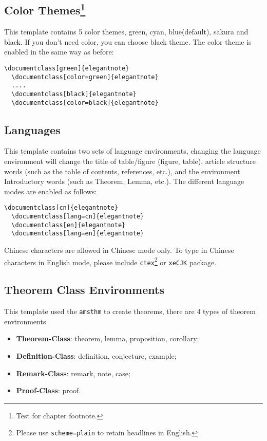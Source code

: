\documentclass[en,hazy,blue,screen,14pt]{elegantnote}
\begin{document}
\newpage
\subsection[Color Themes]{Color Themes\footnote{Test for chapter footnote.}}

This template contains 5 color themes, \textcolor{egreen}{green}, \textcolor{ecyan}{cyan}, \textcolor{eblue}{blue}(default), \textcolor{sakura}{sakura} and \textcolor{black}{black}. If you don't need color, you can choose black theme. The color theme is enabled in the same way as before:
\begin{lstlisting}[frame=none]  
  \documentclass[green]{elegantnote}
  \documentclass[color=green]{elegantnote}
  ....
  \documentclass[black]{elegantnote}
  \documentclass[color=black]{elegantnote}
\end{lstlisting}


\subsection{Languages}

This template contains two sets of language environments, changing the language environment will change the title of table/figure (figure, table), article structure words (such as the table of contents, references, etc.), and the environment Introductory words (such as Theorem, Lemma, etc.). The different language modes are enabled as follows:
\begin{lstlisting}[frame=none]  
  \documentclass[cn]{elegantnote}
  \documentclass[lang=cn]{elegantnote}
  \documentclass[en]{elegantnote}
  \documentclass[lang=en]{elegantnote}
\end{lstlisting}

\begin{note}
Chinese characters are allowed in Chinese mode only. To type in Chinese characters in English mode, please include \lstinline{ctex}\footnote{Please use \lstinline{scheme=plain} to retain headlines in English.} or \lstinline{xeCJK} package.
\end{note}


\subsection{Theorem Class Environments}

This template used the \lstinline{amsthm} to create theorems, there are 4 types of theorem environments
\begin{itemize}
  \item \textbf{Theorem-Class}: theorem, lemma, proposition, corollary;
  \item \textbf{Definition-Class}: definition, conjecture, example;
  \item \textbf{Remark-Class}: remark, note, case;
  \item \textbf{Proof-Class}: proof.
\end{itemize}
\end{document}
